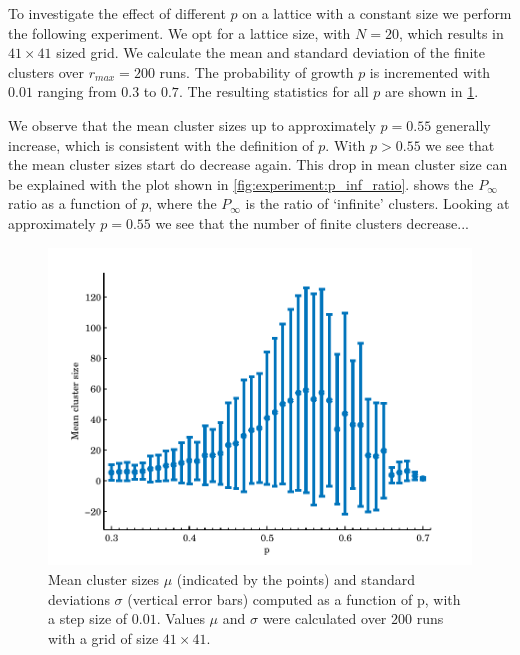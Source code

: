 
To investigate the effect of different $p$ on a lattice with a constant size we perform the following experiment. We opt for a lattice size, with $N = 20$, which results in $41 \times 41$ sized grid. We calculate the mean and standard deviation of the finite clusters over $r_{max} = 200$ runs. The probability of growth $p$ is incremented with $0.01$ ranging from $0.3$ to $0.7$. The resulting statistics for all $p$ are shown in \cref{fig:experiment:mean_std_clusters}.

We observe that the mean cluster sizes up to approximately $p = 0.55$ generally increase, which is consistent with the definition of $p$. With $p > 0.55$ we see that the mean cluster sizes start do decrease again. This drop in mean cluster size can be explained with the plot shown in \cref{fig:experiment:p_inf_ratio}.  shows the $P_\infty$ ratio as a function of $p$, where the $P_\infty$ is the ratio of `infinite' clusters. Looking at approximately $p = 0.55$ we see that the number of finite clusters decrease... 

\begin{figure}
	\centering
	\includegraphics[width=\textwidth]{./img/assignment_a_mean_std_p.pdf}
	\caption{Mean cluster sizes $\mu$ (indicated by the points) and standard deviations $\sigma$ (vertical error bars) computed as a function of p, with a step size of $0.01$. Values $\mu$ and $\sigma$ were calculated over $200$ runs with a grid of size $41 \times 41$.}
	\label{fig:experiment:mean_std_clusters}
\end{figure}

